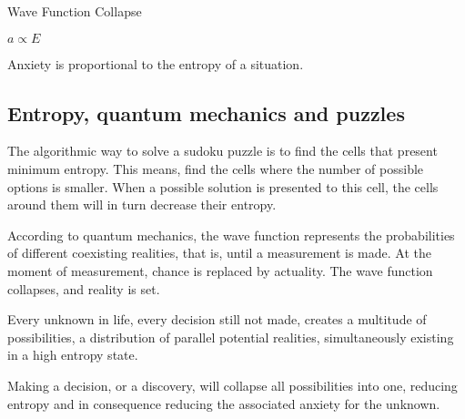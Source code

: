 
\begin{center}
\vspace*{\fill}
\Huge Wave Function Collapse

\vspace{2cm}

\begin{flushright}
\large
\textit{ $a \propto E$ }
\end{flushright}
\vspace*{\fill}
\end{center}

\normalsize


Anxiety is proportional to the entropy of a situation. 

\subsection*{ Entropy, quantum mechanics and puzzles} 

The algorithmic way to solve a sudoku puzzle is to find the cells 
that present minimum entropy. 
This means, find the cells where the number of possible options is smaller.
When a possible solution is presented to this cell, the cells around them will 
in turn decrease their entropy. 

According to quantum mechanics, the wave function represents the probabilities 
of different coexisting realities, that is, until a 
measurement is made. At the moment of measurement, chance is replaced by 
actuality. The wave function collapses, and reality is set.

Every unknown in life, every decision still not made, creates a multitude of 
possibilities, a distribution of parallel potential realities, simultaneously 
existing in a high entropy state. 

Making a decision, or a discovery, will collapse all possibilities into one, 
reducing entropy and in consequence reducing the associated anxiety for the unknown. 





